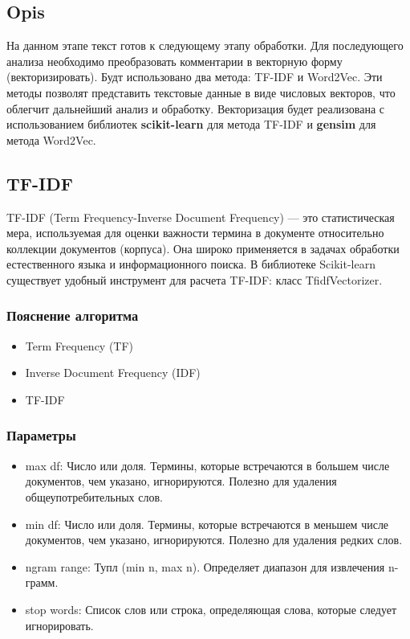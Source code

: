 	\subsection{Opis}
		На данном этапе текст готов к следующему этапу обработки. Для последующего анализа необходимо преобразовать комментарии в векторную форму (векторизировать). Будт использовано два метода: TF-IDF и Word2Vec. Эти методы позволят представить текстовые данные в виде числовых векторов, что облегчит дальнейший анализ и обработку. Векторизация будет реализована с использованием библиотек \textbf{scikit-learn} для метода TF-IDF и \textbf{gensim} для метода Word2Vec.
	
	\subsection{TF-IDF}
 		TF-IDF (Term Frequency-Inverse Document Frequency) — это статистическая мера, используемая для оценки важности термина в документе относительно коллекции документов (корпуса). Она широко применяется в задачах обработки естественного языка и информационного поиска. В библиотеке Scikit-learn существует удобный инструмент для расчета TF-IDF: класс TfidfVectorizer.
		
		\subsubsection{Пояснение алгоритма}
			\begin{itemize}
				\item Term Frequency (TF)
				\item Inverse Document Frequency (IDF)
				\item TF-IDF
			\end{itemize}
			

		\subsubsection{Параметры }
			\begin{itemize}
				\item max df: Число или доля. Термины, которые встречаются в большем числе документов, чем указано, игнорируются. Полезно для удаления общеупотребительных слов.
				\item min df: Число или доля. Термины, которые встречаются в меньшем числе документов, чем указано, игнорируются. Полезно для удаления редких слов.
				\item ngram range: Тупл (min n, max n). Определяет диапазон для извлечения n-грамм.
				\item stop words: Список слов или строка, определяющая слова, которые следует игнорировать. 
			\end{itemize}
		
